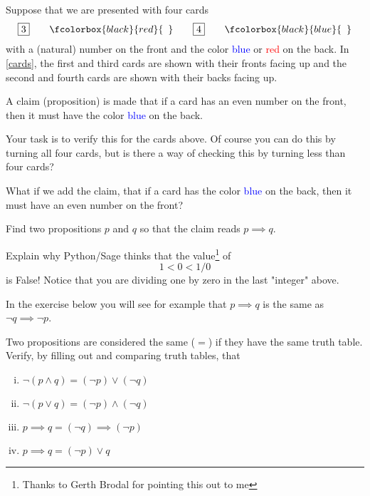 \begin{exercise}\label{excolorcards}
  Suppose that we are presented with four cards
  \begin{equation}\label{cards}
    \boxed{3}\qquad \fcolorbox{black}{red}{\phantom{3}}
    \qquad\boxed{4}\qquad \fcolorbox{black}{blue}{\phantom{4}}
  \end{equation}
  with a (natural) number on the front and the color
  \textcolor{blue}{blue} or \textcolor{red}{red} on the back.
  In \eqref{cards}, the first and third cards are shown with their fronts facing up and
  the second and fourth cards are shown with their backs facing up.

  A claim (proposition) is made that if a card has an even number on the front, then it
  must have the color \textcolor{blue}{blue} on the back.

  Your task is to verify this for the cards above. Of course you can
  do this by turning all four cards, but is there a way of checking this
  by turning less than four cards?

  What if we add the claim, that if a card has the color
  \textcolor{blue}{blue} on the back, then
  it must have an even number on the front?

  \begin{hint}
    Find two propositions $p$ and $q$ so that the claim reads
    $p\implies q$.
  \end{hint}

\end{exercise}

\begin{exercise}
  Explain why Python/Sage thinks that the value\footnote{Thanks to Gerth Brodal for pointing this out to me} of
  $$
    1 < 0 < 1/0
  $$
  is False! Notice that you are dividing one by zero in the last "integer" above.
\end{exercise}

In the exercise below you will see for example that
$p\implies q$ is the same as $\neg q \implies \neg p$.

\begin{exercise}\label{trutheq}
  Two propositions are considered the same ($=$) if they have the same truth table. Verify, by
  filling out and comparing truth tables, that
  \begin{enumerate}[(i)]
    \item
          $\neg (p \land q) = (\neg p) \lor (\neg q)$
    \item
          $\neg (p \lor q) = (\neg p) \land (\neg q)$
    \item
          $p \implies q = (\neg q) \implies (\neg p)$
    \item
          $p \implies q = (\neg p)\lor q$
  \end{enumerate}
\end{exercise}

